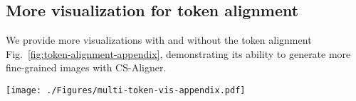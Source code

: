 \subsection{More visualization for token alignment}
\label{sec:token-alignment}

We provide more visualizations with and without the token alignment Fig.~\ref{fig:token-alignment-appendix}, demonstrating its ability to generate more fine-grained images with CS-Aligner.

\begin{figure*}[htbp]
  \centering  \texttt{[image: ./Figures/multi-token-vis-appendix.pdf]} %
\caption{\textbf{Token alignment is effective for fine-grained generations with more details and stronger semantic correspondence with the text inputs.} } 
\label{fig:token-alignment-appendix}
\end{figure*}



